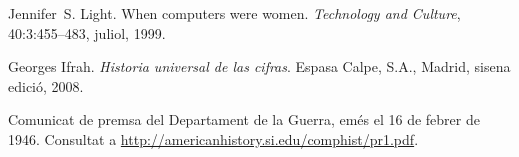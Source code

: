 \begin{thebibliography}{10}

Jennifer~S. Light.
\newblock When computers were women.
\newblock \textit{Technology and Culture}, 40:3:455--483, juliol, 1999.

Georges Ifrah.
\newblock \textit{Historia universal de las cifras}.
\newblock Espasa Calpe, S.A., Madrid, sisena edició, 2008.

Comunicat de premsa del Departament de la Guerra, 
emés el 16 de febrer de 1946. 
\newblock Consultat a 
\url{http://americanhistory.si.edu/comphist/pr1.pdf}.

\end{thebibliography}